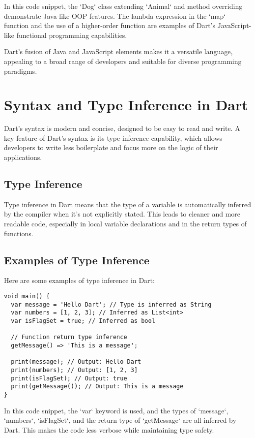 \documentclass{book}
\begin{document}
In this code snippet, the `Dog` class extending `Animal` and method overriding demonstrate Java-like OOP features. The lambda expression in the `map` function and the use of a higher-order function are examples of Dart's JavaScript-like functional programming capabilities.

Dart's fusion of Java and JavaScript elements makes it a versatile language, appealing to a broad range of developers and suitable for diverse programming paradigms.

\chapter{Syntax and Type Inference in Dart}

Dart's syntax is modern and concise, designed to be easy to read and write. A key feature of Dart's syntax is its type inference capability, which allows developers to write less boilerplate and focus more on the logic of their applications.

\section{Type Inference}
Type inference in Dart means that the type of a variable is automatically inferred by the compiler when it's not explicitly stated. This leads to cleaner and more readable code, especially in local variable declarations and in the return types of functions.

\section{Examples of Type Inference}
Here are some examples of type inference in Dart:

\begin{lstlisting}[style=dartstyle]
void main() {
  var message = 'Hello Dart'; // Type is inferred as String
  var numbers = [1, 2, 3]; // Inferred as List<int>
  var isFlagSet = true; // Inferred as bool

  // Function return type inference
  getMessage() => 'This is a message';

  print(message); // Output: Hello Dart
  print(numbers); // Output: [1, 2, 3]
  print(isFlagSet); // Output: true
  print(getMessage()); // Output: This is a message
}
\end{lstlisting}

In this code snippet, the `var` keyword is used, and the types of `message`, `numbers`, `isFlagSet`, and the return type of `getMessage` are all inferred by Dart. This makes the code less verbose while maintaining type safety.
\end{document}
